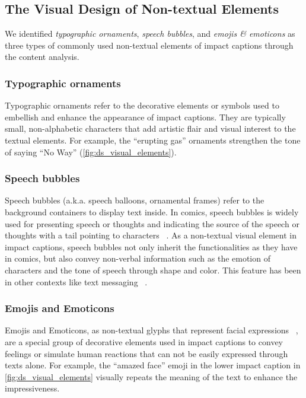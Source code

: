 

\subsection{The Visual Design of Non-textual Elements}
We identified \emph{typographic ornaments}, \emph{speech bubbles}, and \emph{emojis \& emoticons} as three types of commonly used non-textual elements of impact captions through the content analysis.

\subsubsection{Typographic ornaments}
Typographic ornaments refer to the decorative elements or symbols used to embellish and enhance the appearance of impact captions. They are typically small, non-alphabetic characters that add artistic flair and visual interest to the textual elements.
For example, the ``erupting gas'' ornaments strengthen the tone of saying ``No Way'' (\autoref{fig:ds_visual_elements}).

\subsubsection{Speech bubbles}
Speech bubbles (a.k.a. speech balloons, ornamental frames) refer to the background containers to display text inside.
In comics, speech bubbles is widely used for presenting speech or thoughts and indicating the source of the speech or thoughts with a tail pointing to characters ~\cite{cohn2013beyond}. 
As a non-textual visual element in impact captions, speech bubbles not only inherit the functionalities as they have in comics, but also convey non-verbal information such as the emotion of characters and the tone of speech through shape and color. This feature has been in other contexts like text messaging ~\cite{aoki2022emoballoon}.

\subsubsection{Emojis and Emoticons}
Emojis and Emoticons, as non-textual glyphs that represent facial expressions ~\cite{lo2008nonverbal}, are a special group of decorative elements used in impact captions to convey feelings or simulate human reactions that can not be easily expressed through texts alone.
For example, the ``amazed face'' emoji in the lower impact caption in \autoref{fig:ds_visual_elements} visually repeats the meaning of the text to enhance the impressiveness.

